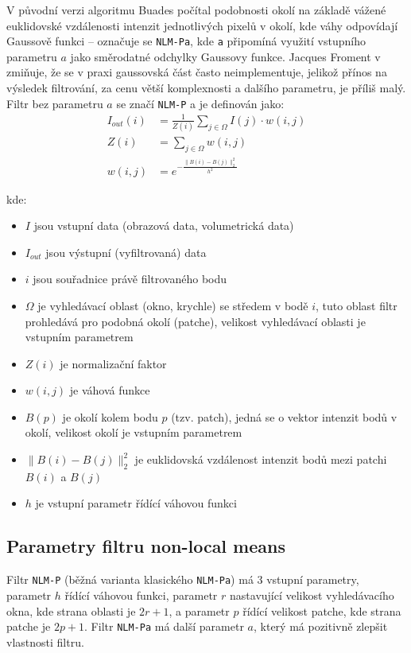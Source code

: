 V původní verzi algoritmu \cite{nlm2005:buades} Buades počítal podobnosti okolí na základě vážené euklidovské vzdálenosti intenzit jednotlivých pixelů v okolí, kde váhy odpovídají Gaussově funkci -- označuje se \texttt{NLM-Pa}, kde \texttt{a} připomíná využití vstupního parametru $a$ jako směrodatné odchylky Gaussovy funkce. Jacques Froment v \cite{nlm2014:froment} zmiňuje, že se v praxi gaussovská část často neimplementuje, jelikož přínos na výsledek filtrování, za cenu větší komplexnosti a dalšího parametru, je příliš malý. Filtr bez parametru $a$ se značí \texttt{NLM-P} a je definován jako: 
\begin{align}
    \label{eq:nlm}
    I_{out}(i) &= \frac{1}{Z(i)}\displaystyle\sum_{j\in\Omega}{I(j) \cdot w(i, j)} \\
    Z(i) &= \displaystyle\sum_{j\in\Omega}{w(i, j)} \\
    w(i, j) &= e^{-\frac{\|B(i) - B(j)\|_2^2}{h^2}}
\end{align}

kde:
\begin{itemize}
    \item $I$ jsou vstupní data (obrazová data, volumetrická data)
    \item $I_{out}$ jsou výstupní (vyfiltrovaná) data
    \item $i$ jsou souřadnice právě filtrovaného bodu
    \item $\Omega$ je vyhledávací oblast (okno, krychle) se středem v bodě $i$, tuto oblast filtr prohledává pro podobná okolí (patche), velikost vyhledávací oblasti je vstupním parametrem
    \item $Z(i)$ je normalizační faktor
    \item $w(i,j)$ je váhová funkce
    \item $B(p)$ je okolí kolem bodu $p$ (tzv. patch), jedná se o vektor intenzit bodů v okolí, velikost okolí je vstupním parametrem
    \item $\|B(i) - B(j)\|_2^2$ je euklidovská vzdálenost intenzit bodů mezi patchi $B(i)$ a $B(j)$
    \item $h$ je vstupní parametr řídící váhovou funkci
\end{itemize}

\subsection*{Parametry filtru non-local means}
Filtr \texttt{NLM-P} (běžná varianta klasického \texttt{NLM-Pa}) má 3 vstupní parametry, parametr $h$ řídící váhovou funkci, parametr $r$ nastavující velikost vyhledávacího okna, kde strana oblasti je $2r + 1$, a parametr $p$ řídící velikost patche, kde strana patche je $2p + 1$. Filtr \texttt{NLM-Pa} má další parametr $a$, který má pozitivně zlepšit vlastnosti filtru. 

